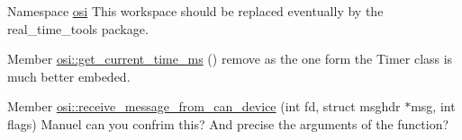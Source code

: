 
\begin{DoxyRefList}
\item[Namespace \mbox{\hyperlink{namespaceosi}{osi}} ]\label{todo__todo000001}%
%
This workspace should be replaced eventually by the real\+\_\+time\+\_\+tools package.  
\item[Member \mbox{\hyperlink{namespaceosi_a2409ab591c4f78d9a8bcfbbe38df9429}{osi::get\+\_\+current\+\_\+time\+\_\+ms}} ()]\label{todo__todo000003}%
%
remove as the one form the Timer class is much better embeded. 
\item[Member \mbox{\hyperlink{namespaceosi_a244466c0afc9ae9fe059cee665fb0603}{osi::receive\+\_\+message\+\_\+from\+\_\+can\+\_\+device}} (int fd, struct msghdr $\ast$msg, int flags)]\label{todo__todo000002}%
%
Manuel can you confrim this? And precise the arguments of the function?
\end{DoxyRefList}